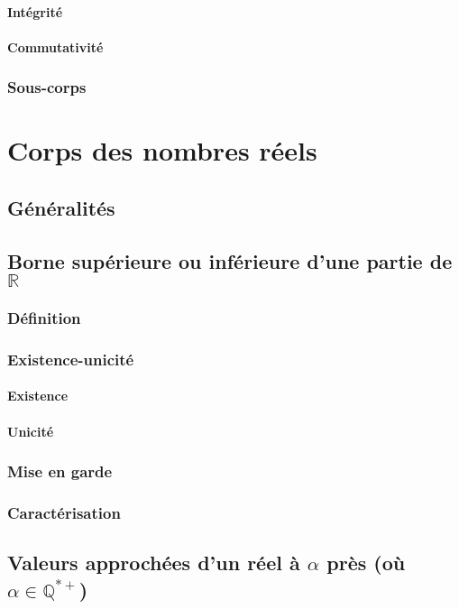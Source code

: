 \documentclass[12pt,a4paper,french]{book}
\begin{document}
			\subsubsection{Intégrité}
			\subsubsection{Commutativité}
		\subsection{Sous-corps}
			
\chapter{Corps des nombres réels}
	\section{Généralités}
	\section{Borne supérieure ou inférieure d'une partie de $\mathbb{R}$}
		\subsection{Définition}
		\subsection{Existence-unicité}
			\subsubsection{Existence}
			\subsubsection{Unicité}
		\subsection{Mise en garde}
		\subsection{Caractérisation}
	\section{Valeurs approchées d'un réel à $\alpha$ près (où $\alpha \in \mathbb{Q}^{\ast+}$)}
\end{document}
